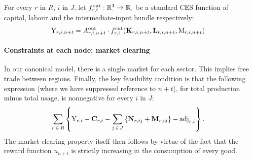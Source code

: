 \documentclass[12pt,a4paper,twoside, draft]{article}
\begin{document}
For every $r$ in $R$, $i$ in $J$, let
$f_{r, i}^{\textup{out}}: \nnreal^{3} \rightarrow \nnreal$ be a standard
CES function of capital, labour and the intermediate-input bundle respectively:
\begin{equation}
	\textup{Y}_{r, i, n + t}
    = A_{r, i, n + t}^{\textup{out}} \cdot f_{r, i}
      ^ \textup{out}(
        \mathbf{K}_{r, i, n + t},
        \mathbf{L}_{r, i, n + t},
        \textup{M}_{r, i, n + t}
        )
\end{equation}
\paragraph{Constraints at each node: market clearing}
In our canonical model, there is a single market for each sector.
This implies free trade between regions.
Finally, the key feasibility condition is that the following expression (where
we have suppressed reference to $n + t$), for total production minus total
usage, is nonnegative for every $i$ in $J$:
\begin{equation}
  \sum_{r \,\in\, R} \left\{
  \textup{Y}_{r, i}
  - \mathbf{C}_{r, i}
  - \sum_{j \,\in\, J}
      \left\{\mathbf{N}_{r, ij} + \mathbf{M}_{r, ij}\right\}
  - \textup{adj}_{r, i} \right\}.
\end{equation}
The market clearing property itself then follows by virtue of the fact that
the reward function $u_{n + t}$ is strictly increasing in the
consumption of every good.
\end{document}
